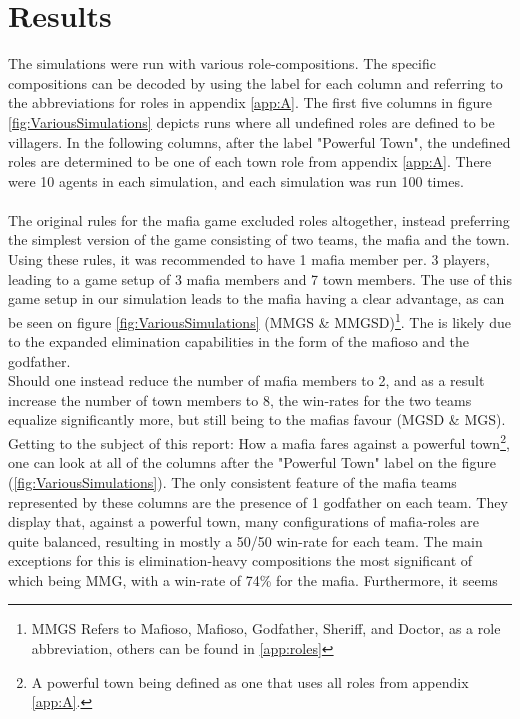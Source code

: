 \section{Results}\label{sec:results}
The simulations were run with various 
role-compositions. The specific compositions 
can be decoded by using the label for each 
column and referring to the abbreviations for 
roles in appendix \ref{app:A}. The first five 
columns in figure 
\ref{fig:VariousSimulations} depicts runs 
where all undefined roles are defined to be 
villagers. In the following columns, after 
the label "Powerful Town", the undefined 
roles are determined to be one of each town 
role from appendix \ref{app:A}. There were 10 
agents in each simulation, and each 
simulation was run 100 times.\\\\
The original rules for the mafia game 
excluded roles altogether, instead
preferring the simplest version of the game consisting of two teams, the mafia
and the town. Using these rules\cite{MafiaRules}, it was recommended to have 1
mafia member per. 3 players, leading to a game setup of 3 mafia members and 7
town members. The use of this game setup in our simulation leads to the mafia
having a clear advantage, as can be seen on figure \ref{fig:VariousSimulations}
(MMGS \& MMGSD)\footnote{MMGS Refers to Mafioso, Mafioso, Godfather, Sheriff,
    and Doctor, as a role abbreviation, others can be found in \ref{app:roles}}.
The is likely due to the expanded elimination capabilities in the form of the
mafioso and the godfather. \\ Should one instead reduce the number of mafia
members to 2, and as a result increase the number of town members to 8, the
win-rates for the two teams equalize significantly more, but still being to the
mafias favour (MGSD \& MGS).\\ Getting to the subject of this report: How a
mafia fares against a powerful town\footnote{A powerful town being defined as
    one that uses all roles from appendix \ref{app:A}.}, one can look at all of the
columns after the "Powerful Town" label on the figure
(\ref{fig:VariousSimulations}). The only consistent feature of the mafia teams
represented by these columns are the presence of 1 godfather on each team. They
display that, against a powerful town, many configurations of mafia-roles are
quite balanced, resulting in mostly a 50/50 win-rate for each team. The main
exceptions for this is elimination-heavy compositions the most significant of
which being MMG, with a win-rate of 74\% for the mafia. Furthermore, it seems
